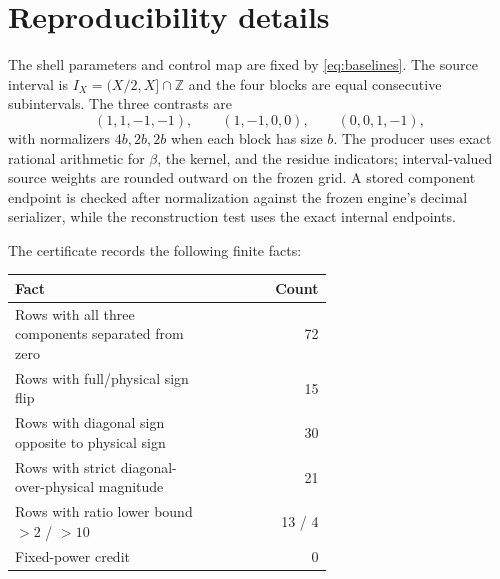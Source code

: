 \documentclass[11pt]{article}
\newcommand{\1}{\mathbf{1}}
\begin{document}
\appendix
\section{Reproducibility details}

The shell parameters and control map are fixed by \eqref{eq:baselines}.  The
source interval is $I_X=(X/2,X]\cap\mathbb Z$ and the four blocks are equal
consecutive subintervals.  The three contrasts are
\[
 (1,1,-1,-1),\qquad (1,-1,0,0),\qquad (0,0,1,-1),
\]
with normalizers $4b,2b,2b$ when each block has size $b$.  The producer uses
exact rational arithmetic for $\beta$, the kernel, and the residue indicators;
interval-valued source weights are rounded outward on the frozen grid.  A
stored component endpoint is checked after normalization against the frozen
engine's decimal serializer, while the reconstruction test uses the exact
internal endpoints.

The certificate records the following finite facts:
\begin{center}
\begin{tabular}{>{\raggedright\arraybackslash}p{0.63\linewidth}r}
\toprule
Fact & Count\\
\midrule
Rows with all three components separated from zero & 72\\
Rows with full/physical sign flip & 15\\
Rows with diagonal sign opposite to physical sign & 30\\
Rows with strict diagonal-over-physical magnitude & 21\\
Rows with ratio lower bound $>2$ / $>10$ & 13 / 4\\
Fixed-power credit & 0\\
\bottomrule
\end{tabular}
\end{center}



\end{document}
